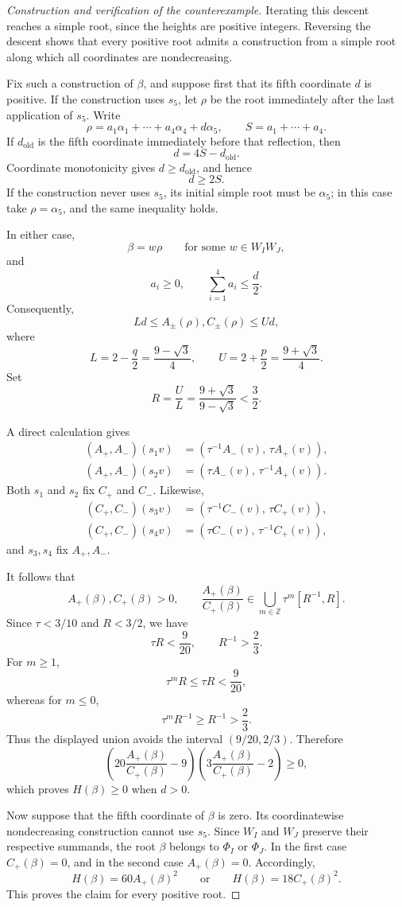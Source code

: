 \documentclass[11pt,reqno]{amsart}
\theoremstyle{plain}
\theoremstyle{definition}
\theoremstyle{remark}
\numberwithin{equation}{section}
\begin{document}
\begin{proof}[Construction and verification of the counterexample]
Iterating this descent reaches a simple root, since the heights
are positive integers. Reversing the descent shows that every
positive root admits a construction from a simple root along
which all coordinates are nondecreasing.

Fix such a construction of $\beta$, and suppose first that its
fifth coordinate $d$ is positive. If the construction uses $s_5$,
let $\rho$ be the root immediately after the last application of
$s_5$. Write
\[
\rho=a_1\alpha_1+\cdots+a_4\alpha_4+d\alpha_5,
\qquad
S=a_1+\cdots+a_4.
\]
If $d_{\mathrm{old}}$ is the fifth coordinate immediately before
that reflection, then
\[
d=4S-d_{\mathrm{old}}.
\]
Coordinate monotonicity gives $d\ge d_{\mathrm{old}}$, and hence
\[
d\ge2S.
\]
If the construction never uses $s_5$, its initial simple root
must be $\alpha_5$; in this case take $\rho=\alpha_5$, and the same
inequality holds.

In either case,
\[
\beta=w\rho
\qquad\text{for some }w\in W_IW_J,
\]
and
\[
a_i\ge0,\qquad \sum_{i=1}^4a_i\le\frac d2.
\]
Consequently,
\[
Ld\le A_\pm(\rho),C_\pm(\rho)\le Ud,
\]
where
\[
L=2-\frac q2=\frac{9-\sqrt3}{4},
\qquad
U=2+\frac p2=\frac{9+\sqrt3}{4}.
\]
Set
\[
R=\frac UL=\frac{9+\sqrt3}{9-\sqrt3}<\frac32.
\]

A direct calculation gives
\[
\begin{aligned}
(A_+,A_-)(s_1v)
&=(\tau^{-1}A_-(v),\,\tau A_+(v)),\\
(A_+,A_-)(s_2v)
&=(\tau A_-(v),\,\tau^{-1}A_+(v)).
\end{aligned}
\]
Both $s_1$ and $s_2$ fix $C_+$ and $C_-$. Likewise,
\[
\begin{aligned}
(C_+,C_-)(s_3v)
&=(\tau^{-1}C_-(v),\,\tau C_+(v)),\\
(C_+,C_-)(s_4v)
&=(\tau C_-(v),\,\tau^{-1}C_+(v)),
\end{aligned}
\]
and $s_3,s_4$ fix $A_+,A_-$.

It follows that
\[
A_+(\beta),C_+(\beta)>0,
\qquad
\frac{A_+(\beta)}{C_+(\beta)}
\in
\bigcup_{m\in\mathbb Z}\tau^m[R^{-1},R].
\]
Since $\tau<3/10$ and $R<3/2$, we have
\[
\tau R<\frac9{20},
\qquad
R^{-1}>\frac23.
\]
For $m\ge1$,
\[
\tau^mR\le\tau R<\frac9{20},
\]
whereas for $m\le0$,
\[
\tau^mR^{-1}\ge R^{-1}>\frac23.
\]
Thus the displayed union avoids the interval
$(9/20,2/3)$. Therefore
\[
\left(
20\frac{A_+(\beta)}{C_+(\beta)}-9
\right)
\left(
3\frac{A_+(\beta)}{C_+(\beta)}-2
\right)
\ge0,
\]
which proves $H(\beta)\ge0$ when $d>0$.

Now suppose that the fifth coordinate of $\beta$ is zero.
Its coordinatewise nondecreasing construction cannot use $s_5$.
Since $W_I$ and $W_J$ preserve their respective summands, the
root $\beta$ belongs to $\Phi_I$ or $\Phi_J$. In the first case
$C_+(\beta)=0$, and in the second case $A_+(\beta)=0$. Accordingly,
\[
H(\beta)=60A_+(\beta)^2
\qquad\text{or}\qquad
H(\beta)=18C_+(\beta)^2.
\]
This proves the claim for every positive root.


\end{proof}
\end{document}
